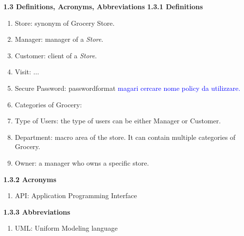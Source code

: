 \documentclass[a4paper, 10pt, oneside]{article}
\newcommand*{\lorenzo}[1]{\textcolor{BurntOrange}{#1}}
\newcommand{\giovanni}[1]{\textcolor{Blue}{#1}}
\begin{document}
\begin{itemize}
\begin{enumerate}[label={S.M.\arabic{*}}]
        
    \end{enumerate}
\end{itemize}


{\large \textbf{1.3 Definitions, Acronyms, Abbreviations}}
\newline \newline
\textbf{1.3.1 Definitions}

\begin{enumerate}[label={D.\arabic{*}}]
\item \label{def:store} Store: synonym of Grocery Store.
\item \label{def:manager} Manager: manager of a \textit{Store}. %
\item \label{def:customer} Customer: client of a \textit{Store}. %
\item \label{def:visit} Visit: ... %
\item \label{def:securepass} Secure Password: \lorenzo{passwordformat} \giovanni{magari cercare nome policy da utilizzare.}
\item Categories of Grocery:
\item Type of Users: the type of users can be either Manager or Customer.
\item Department: macro area of the store. It can contain multiple categories of Grocery.
\item Owner: a manager who owns a specific store.
\end{enumerate}

\textbf{1.3.2 Acronyms}
\begin{enumerate}[label={A.\arabic{*}}]
\item \label{def:API} API: Application Programming Interface
\end{enumerate}
\textbf{1.3.3 Abbreviations}
\begin{enumerate}[label={AB.\arabic{*}}]
\item \label{def:UML} UML: Uniform Modeling language
\end{enumerate}
\end{document}

